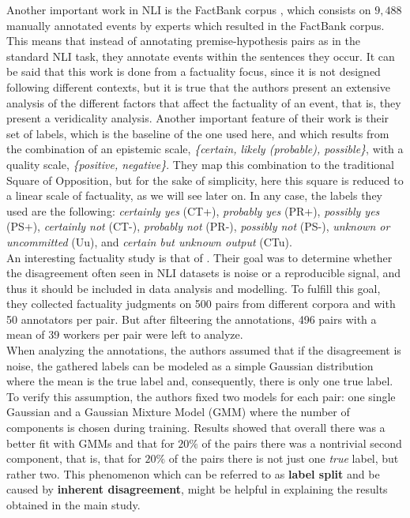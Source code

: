 Another important work in NLI is the FactBank corpus \citep{sauri2009factbank}, which consists on $9,488$ manually annotated events by experts which resulted in the FactBank corpus. This means that instead of annotating premise-hypothesis pairs as in the standard NLI task, they annotate events within the sentences they occur. It can be said that this work is done from a factuality focus, since it is not designed following different contexts, but it is true that the authors present an extensive analysis of the different factors that affect the factuality of an event, that is, they present a  veridicality analysis. Another important feature of their work is their set of labels, which is the baseline of the one used here, and which results from the combination of an epistemic scale, \textit{\{certain, likely (probable), possible\}}, with a quality scale, \textit{\{positive, negative\}}. They map this combination to the traditional Square of Opposition, but for the sake of simplicity, here this square is reduced to a linear scale of factuality, as we will see later on. In any case, the labels they used are the following: \textit{certainly yes} (CT+), \textit{probably yes} (PR+), \textit{possibly yes} (PS+), \textit{certainly not} (CT-), \textit{probably not} (PR-), \textit{possibly not} (PS-), \textit{unknown or uncommitted} (Uu), and \textit{certain but unknown output} (CTu).\\

An interesting factuality study is that of \citet{pavlick2019inherent}. Their goal was to determine whether the disagreement often seen in NLI datasets is noise or a reproducible signal, and thus it should be included in data analysis and modelling. To fulfill this goal, they collected factuality judgments on 500 pairs from different corpora and with 50 annotators per pair. But after filteering the annotations, 496 pairs with a mean of 39 workers per pair were left to analyze.\\

When analyzing the annotations, the authors assumed that if the disagreement is noise, the gathered labels can be modeled as a simple Gaussian distribution where the mean is the true label and, consequently, there is only one true label. To verify this assumption, the authors fixed two models for each pair: one single Gaussian and a Gaussian Mixture Model (GMM) where the number of components is chosen during training. Results showed that overall there was a better fit with GMMs and that for $20\%$ of the pairs there was a nontrivial second component, that is, that for $20\%$ of the pairs there is not just one \textit{true} label, but rather two. This phenomenon which can be referred to as \textbf{label split} \citep{de2012did} and be caused by \textbf{inherent disagreement}, might be helpful in explaining the results obtained in the main study.\\

